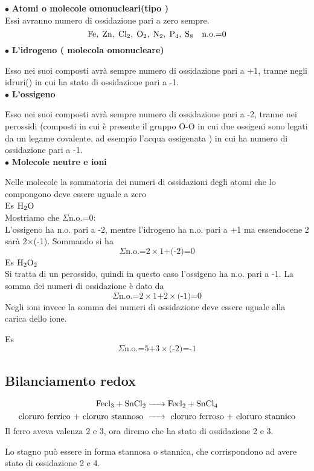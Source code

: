 $\bullet$ \textbf{Atomi o molecole omonucleari(tipo )}\\
Essi avranno numero di ossidazione pari a zero sempre.
$$\ce{Fe,\;Zn,\;Cl_2,\;O_2,\;N_2,\;P_4,\;S_8}\quad \text{n.o.=0}$$
$\bullet$  \textbf{L'idrogeno ( molecola omonucleare)}

Esso nei suoi composti avrà sempre numero di ossidazione pari a +1, tranne negli idruri() in cui ha stato di ossidazione pari a -1.\\
$\bullet$  \textbf{L'ossigeno}

Esso nei suoi composti avrà sempre numero di ossidazione pari a -2, tranne nei perossidi (composti in cui è presente il gruppo O-O in cui due ossigeni sono legati da un legame covalente, ad esempio l'acqua ossigenata ) in cui ha numero di ossidazione pari a -1.\\
$\bullet$  \textbf{Molecole neutre e ioni}

Nelle molecole la sommatoria dei numeri di ossidazioni degli atomi che lo compongono deve essere uguale a zero\\

Es $\ce{H_2O}\qquad$\\
Mostriamo che $\Sigma$n.o.=0:\\
L'ossigeno ha n.o. pari a -2, mentre l'idrogeno ha n.o. pari a +1 ma essendocene 2 sarà 2$\times$(-1). Sommando si ha\\
$$\Sigma \text{n.o.=2} \times \text{1+(-2)=0}$$
Es $\ce{H_2O_2}$\\
Si tratta di un perossido, quindi in questo caso l'ossigeno ha n.o. pari a -1. La somma dei numeri di ossidazione è dato da\\
$$\Sigma \text{n.o.=2} \times \text{1+2} \times \text{(-1)=0}$$
Negli ioni invece la somma dei numeri di ossidazione deve essere uguale alla carica dello ione.

Es 
$$\Sigma \text{n.o.=5+3} \times \text{(-2)=-1}$$
\subsection{Bilanciamento redox}
$$\ce{Fecl_3 + SnCl_2 -> Fecl_2 + SnCl_4}$$
$$\text{cloruro ferrico + cloruro stannoso \ce{->} cloruro ferroso + cloruro stannico}$$
Il ferro aveva valenza 2 e 3, ora diremo che ha stato di ossidazione 2 e 3.

Lo stagno può essere in forma stannosa o stannica, che corrispondono ad avere stato di ossidazione 2 e 4.

